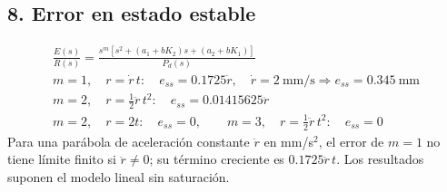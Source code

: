 \documentclass[11pt]{article}
\begin{document}
\subsection*{8. Error en estado estable}
\begin{gather*}
\frac{E(s)}{R(s)}=\frac{s^m[s^2+(a_1+bK_2)s+(a_2+bK_1)]}{P_d(s)}\\
m=1,\quad r=\dot r\,t:\quad e_{ss}=0.1725\dot r,\quad\dot r=2~\text{mm/s}\Rightarrow e_{ss}=0.345~\text{mm}\\
m=2,\quad r=\tfrac12\ddot r\,t^2:\quad e_{ss}=0.01415625\ddot r\\
m=2,\quad r=2t:\quad e_{ss}=0,\qquad m=3,\quad r=\tfrac12\ddot r\,t^2:\quad e_{ss}=0
\end{gather*}
Para una parábola de aceleración constante $\ddot r$ en mm/s$^2$, el error de $m=1$ no tiene límite finito si $\ddot r\ne0$; su término creciente es $0.1725\ddot r\,t$. Los resultados suponen el modelo lineal sin saturación.
\end{document}
